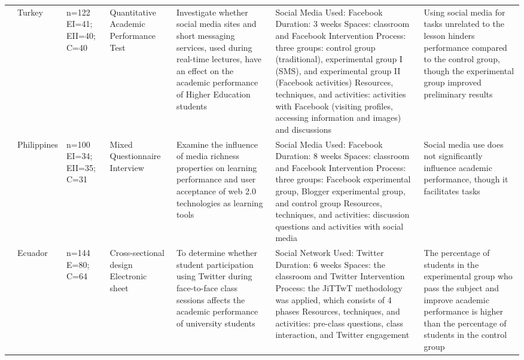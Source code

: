 \documentclass[english]{textolivre}
\begin{document}
\begin{longtable}{p{} p{} p{} p{} p{} p{} p{}}
\textcite{demirbilek2018} &
Turkey &
n=122\newline
EI=41; EII=40; C=40 &
Quantitative Academic Performance Test &
Investigate whether social media sites and short messaging services, used during real-time lectures, have an effect on the academic performance of Higher Education students &
Social Media Used: Facebook\newline
Duration: 3 weeks\newline
Spaces: classroom and Facebook\newline
Intervention Process: three groups: control group (traditional), experimental group I (SMS), and experimental group II (Facebook activities)\newline
Resources, techniques, and activities: activities with Facebook (visiting profiles, accessing information and images) and discussions &
Using social media for tasks unrelated to the lesson hinders performance compared to the control group, though the experimental group improved preliminary results
\\

\textcite{penalba2020} &
Philippines &
n=100\newline
EI=34; EII=35; C=31 &
Mixed Questionnaire Interview &
Examine the influence of media richness properties on learning performance and user acceptance of web 2.0 technologies as learning tools &
Social Media Used: Facebook\newline
Duration: 8 weeks\newline
Spaces: classroom and Facebook\newline
Intervention Process: three groups: Facebook experimental group, Blogger experimental group, and control group\newline
Resources, techniques, and activities: discussion questions and activities with social media &
Social media use does not significantly influence academic performance, though it facilitates tasks
\\

\textcite{perezsuasnavas2022} &
Ecuador &
n=144\newline
E=80; C=64 &
Cross-sectional design\newline
Electronic sheet &
To determine whether student participation using Twitter during face-to-face class sessions affects the academic performance of university students &
Social Network Used: Twitter\newline
Duration: 6 weeks\newline
Spaces: the classroom and Twitter\newline
Intervention Process: the JiTTwT methodology was applied, which consists of 4 phases\newline
Resources, techniques, and activities: pre-class questions, class interaction, and Twitter engagement &
The percentage of students in the experimental group who pass the subject and improve academic performance is higher than the percentage of students in the control group
\\


\end{longtable}
\end{document}
